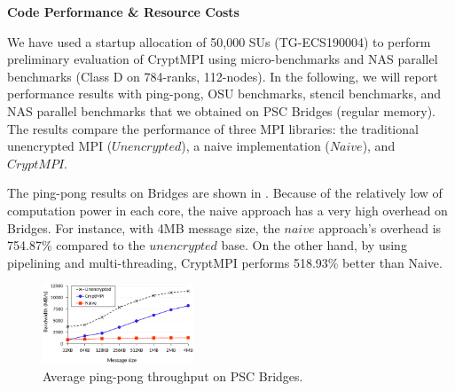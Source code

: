 \centerline{\Large\bfseries Code Performance \& Resource Costs}

%

We have used a startup allocation of 50,000 SUs (TG-ECS190004) to perform
preliminary evaluation of CryptMPI using micro-benchmarks and
NAS parallel benchmarks (Class D on 784-ranks, 112-nodes). 
In the following, we will report performance results with ping-pong, OSU benchmarks, stencil
benchmarks, and NAS parallel benchmarks that we obtained on
PSC Bridges (regular memory). The results compare the performance of
three MPI libraries: the traditional unencrypted
MPI ($Unencrypted$), a naive implementation ($Naive$), and $CryptMPI$. 

The ping-pong results on Bridges are shown in . Because of
the relatively low of computation power in each core,
the naive approach has a very high overhead on Bridges.
For instance, with 4MB message size,
the $naive$ approach's overhead is 754.87\% compared to the $unencrypted$
base. On the other hand, by using pipelining and multi-threading, CryptMPI performs
518.93\% better than Naive.

\begin{figure}[htb]
	\centering
		\includegraphics[width=0.4\textwidth]{graphs/infini-xsede-pingpong.eps}
	\caption{Average %
	ping-pong throughput on PSC Bridges.}
	\label{fig:xsede_pingpong}
	\vspace{-2ex}
\end{figure}

